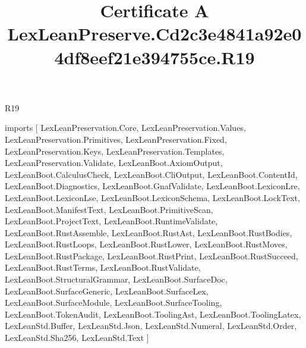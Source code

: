 \begin{lexlean}{R19}
\title{Certificate A LexLeanPreserve.Cd2c3e4841a92e04df8eef21e394755ce.R19}
\begin{coremodule}
imports [
  LexLeanPreservation.Core,
  LexLeanPreservation.Values,
  LexLeanPreservation.Primitives,
  LexLeanPreservation.Fixed,
  LexLeanPreservation.Keys,
  LexLeanPreservation.Templates,
  LexLeanPreservation.Validate,
  LexLeanBoot.AxiomOutput,
  LexLeanBoot.CalculusCheck,
  LexLeanBoot.CliOutput,
  LexLeanBoot.ContentId,
  LexLeanBoot.Diagnostics,
  LexLeanBoot.GnafValidate,
  LexLeanBoot.LexiconLre,
  LexLeanBoot.LexiconLse,
  LexLeanBoot.LexiconSchema,
  LexLeanBoot.LockText,
  LexLeanBoot.ManifestText,
  LexLeanBoot.PrimitiveScan,
  LexLeanBoot.ProjectText,
  LexLeanBoot.RuntimeValidate,
  LexLeanBoot.RustAssemble,
  LexLeanBoot.RustAst,
  LexLeanBoot.RustBodies,
  LexLeanBoot.RustLoops,
  LexLeanBoot.RustLower,
  LexLeanBoot.RustMoves,
  LexLeanBoot.RustPackage,
  LexLeanBoot.RustPrint,
  LexLeanBoot.RustSucceed,
  LexLeanBoot.RustTerms,
  LexLeanBoot.RustValidate,
  LexLeanBoot.StructuralGrammar,
  LexLeanBoot.SurfaceDoc,
  LexLeanBoot.SurfaceGeneric,
  LexLeanBoot.SurfaceLex,
  LexLeanBoot.SurfaceModule,
  LexLeanBoot.SurfaceTooling,
  LexLeanBoot.TokenAudit,
  LexLeanBoot.ToolingAst,
  LexLeanBoot.ToolingLatex,
  LexLeanStd.Buffer,
  LexLeanStd.Json,
  LexLeanStd.Numeral,
  LexLeanStd.Order,
  LexLeanStd.Sha256,
  LexLeanStd.Text
]


\end{coremodule}
\end{lexlean}
